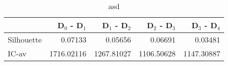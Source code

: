 \begin{table}
\centering
\caption{asd}
\label{tab:delmh-orig-eca-combined}
\begin{tabular}{lrrrr}
\toprule
{} &  D$_0$ - D$_1$ &  D$_1$ - D$_2$ &  D$_2$ - D$_3$ &  D$_3$ - D$_4$ \\
\midrule
Silhouette &        0.07133 &        0.05656 &        0.06691 &        0.03481 \\
IC-av      &     1716.02116 &     1267.81027 &     1106.50628 &     1147.30887 \\
\bottomrule
\end{tabular}
\end{table}
